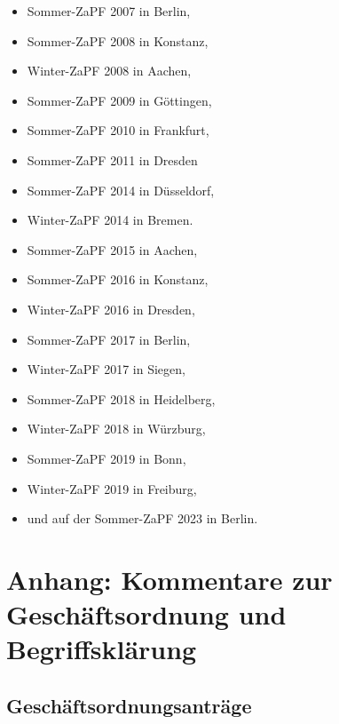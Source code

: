 \documentclass[12pt,oneside]{scrartcl}
\begin{document}
\begin{itemize}
\item Sommer-ZaPF 2007 in Berlin,

\item Sommer-ZaPF 2008 in Konstanz,

\item Winter-ZaPF 2008 in Aachen,

\item Sommer-ZaPF 2009 in Göttingen,

\item Sommer-ZaPF 2010 in Frankfurt,

\item Sommer-ZaPF 2011 in Dresden

\item Sommer-ZaPF 2014 in Düsseldorf,

\item Winter-ZaPF 2014 in Bremen.

\item Sommer-ZaPF 2015 in Aachen,

\item Sommer-ZaPF 2016 in Konstanz,

\item Winter-ZaPF 2016 in Dresden,

\item Sommer-ZaPF 2017 in Berlin,

\item Winter-ZaPF 2017 in Siegen,

\item Sommer-ZaPF 2018 in Heidelberg,

\item Winter-ZaPF 2018 in Würzburg,

\item Sommer-ZaPF 2019 in Bonn,

\item Winter-ZaPF 2019 in Freiburg,

\item und auf der Sommer-ZaPF 2023 in Berlin.
\end{itemize}


\section{Anhang: Kommentare zur Geschäftsordnung und Begriffsklärung%
  \label{anhang-kommentare-zur-geschaftsordnung-und-begriffsklarung}%
}


\subsection{Geschäftsordnungsanträge%
  \label{geschaftsordnungsantrage-1}%
}
\end{document}
